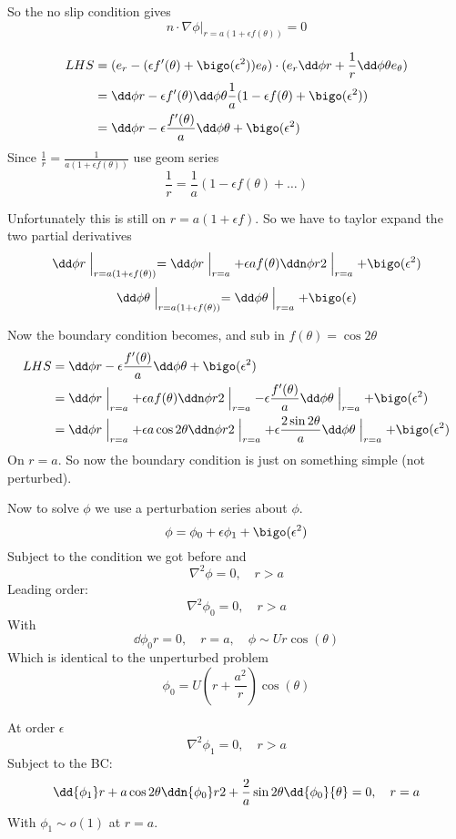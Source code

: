 \documentclass{X:/Documents/Coding/Latex/myassignment}
\begin{document}
So the no slip condition gives
\[n \cdot \nabla \phi|_{r = a(1+\epsilon f(\theta))} = 0\]

\begin{align*}
    LHS &= (e_r - (\epsilon f'(\theta) + \bigo(\epsilon^2))e_\theta) \cdot (e_r \dd\phi r + \frac1r \dd\phi \theta e_\theta )\\
    &= \dd\phi r - \epsilon f'(\theta) \dd\phi\theta \frac1a(1-\epsilon f(\theta) + \bigo(\epsilon^2))\\
    &=\dd\phi r - \epsilon \frac{f'(\theta)}{a} \dd\phi\theta + \bigo(\epsilon^2)
\end{align*}
Since $\frac1r = \frac1{a(1+\epsilon f(\theta))}$ use geom series
\[\frac1r = \frac1a (1-\epsilon f(\theta) + \hdots)\]


Unfortunately this is still on $r=a(1+\epsilon f)$. So we have to taylor expand the two partial derivatives
\[\dd\phi r\Bigm|_{r=a(1+\epsilon f(\theta))} = \dd\phi r\Bigm|_{r=a} + \epsilon a f(\theta) \ddn \phi r2\Bigm|_{r=a} + \bigo(\epsilon^2)\]
\[\dd\phi \theta \Bigm|_{r=a(1+\epsilon f(\theta))} = \dd\phi\theta\Bigm|_{r=a} + \bigo(\epsilon) \]

Now the boundary condition becomes, and sub in $f(\theta) = \cos2\theta$
\begin{align*}
    LHS &= \dd\phi r - \epsilon \frac{f'(\theta)}{a} \dd\phi\theta + \bigo(\epsilon^2)\\
    &=\dd\phi r\Bigm|_{r=a} + \epsilon a f(\theta) \ddn \phi r2\Bigm|_{r=a}  - \epsilon \frac{f'(\theta)}{a}\dd\phi\theta\Bigm|_{r=a} + \bigo(\epsilon^2)\\
    &=\dd\phi r\Bigm|_{r=a} + \epsilon a \cos2\theta \ddn \phi r2\Bigm|_{r=a}  + \epsilon \frac{2\sin2\theta}{a}\dd\phi\theta\Bigm|_{r=a} + \bigo(\epsilon^2)\\
\end{align*}
On $r = a$. So now the boundary condition is just on something simple (not perturbed).


Now to solve $\phi$ we use a perturbation series about $\phi$.
\[\phi = \phi_0 + \epsilon \phi_1 + \bigo(\epsilon^2)\]
Subject to the condition we got before and
\[\nabla^2 \phi = 0, \quad r>a\]
Leading order:
\[\nabla^2 \phi_0 = 0,\quad r>a\]
With
\[\dd{\phi_0}r = 0, \quad r=a, \quad \phi \sim Ur\cos(\theta)\]
Which is identical to the unperturbed problem
\[\phi_0 = U(r + \frac{a^2}{r})\cos(\theta)\]


At order $\epsilon$
\[\nabla^2 \phi_1 = 0, \quad r >a\]
Subject to the BC:
\[\dd{\phi_1}r +a \cos2\theta \ddn{\phi_0}r2 + \frac{2}{a} \sin2\theta \dd{\phi_0}{\theta} = 0, \quad r=a\]
With $\phi_1 \sim o(1)$ at $r=a$.
\end{document}
